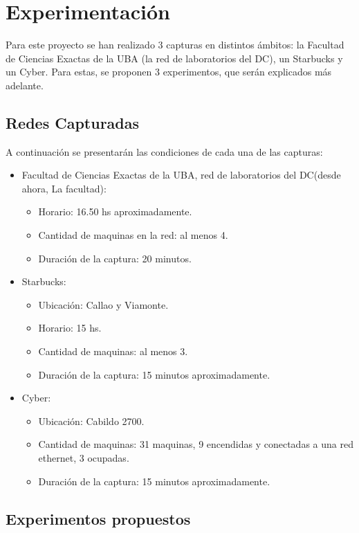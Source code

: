 \section{Experimentación}
Para este proyecto se han realizado 3 capturas en distintos ámbitos: la Facultad de Ciencias Exactas de la UBA (la red de laboratorios del DC), un Starbucks y un Cyber. Para estas, se proponen 3 experimentos, que serán explicados más adelante.

\subsection{Redes Capturadas}

 A continuación se presentarán las condiciones de cada una de las capturas:

\begin{itemize}
	\item Facultad de Ciencias Exactas de la UBA, red de laboratorios del DC(desde ahora, La facultad):
	\begin{itemize}
		\item Horario: 16.50 hs aproximadamente.
		\item Cantidad de maquinas en la red: al menos 4.
		\item Duración de la captura: 20 minutos.
	\end{itemize}

	\item Starbucks:
	\begin{itemize}
		\item Ubicación: Callao y Viamonte.
		\item Horario: 15 hs.
		\item Cantidad de maquinas: al menos 3.
		\item Duración de la captura: 15 minutos aproximadamente.
	\end{itemize}		
	
	\item Cyber:
	\begin{itemize}
		\item Ubicación: Cabildo 2700.
		\item Cantidad de maquinas: 31 maquinas, 9 encendidas y conectadas a una red ethernet, 3 ocupadas.
		\item Duración de la captura: 15 minutos aproximadamente.
	\end{itemize}
	
\end{itemize}

\subsection{Experimentos propuestos}

